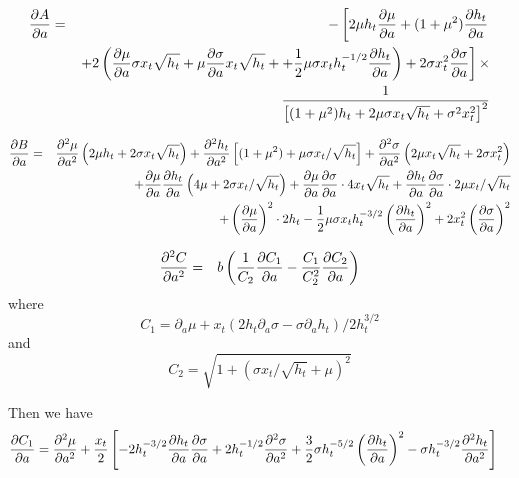 \documentclass{book}
\begin{document}
\begin{enumerate}
  \begin{eqnarray*}
    \frac{\partial A}{\partial a} &=& - \left[
      2\mu h_t \frac{\partial \mu}{\partial a} + (1 + \mu^2) \frac{\partial h_t}{\partial a} \right.\\
    && \left.
      + 2\left(
        \frac{\partial \mu}{\partial a} \sigma x_t \sqrt{h_t} +
        \mu \frac{\partial \sigma}{\partial a} x_t \sqrt{h_t} +
        +{1 \over 2} \mu\sigma x_t h_t^{-1/2} \frac{\partial h_t}{\partial a}
      \right) +2 \sigma x_t^2 \frac{\partial \sigma}{\partial a} \right] \times \\
    && {1 \over
      \left[
        (1 + \mu^2)h_t  +2\mu\sigma x_t \sqrt{h_t} + \sigma^2 x_t^2
      \right]^2}
  \end{eqnarray*}

  \begin{eqnarray*}
    \frac{\partial B}{\partial a} &=&
    \frac{\partial^2 \mu}{\partial a^2} \left(
      2 \mu h_t + 2 \sigma x_t \sqrt{h_t}
    \right) +\frac{\partial^2 h_t}{\partial a^2} \left[
      (1 + \mu^2) + \mu \sigma x_t / \sqrt{h_t}
    \right] +\frac{\partial^2 \sigma}{\partial a^2} \left(
      2 \mu x_t \sqrt{h_t} + 2 \sigma x_t^2
    \right) \\
    &&
    +\frac{\partial \mu}{\partial a} \frac{\partial h_t}{\partial a} \left(
      4 \mu + 2 \sigma x_t / \sqrt{h_t}
    \right) +\frac{\partial \mu}{\partial a} \frac{\partial \sigma}{\partial a} \cdot 4 x_t \sqrt{h_t}
    +\frac{\partial h_t}{\partial a} \frac{\partial \sigma}{\partial a} \cdot 2 \mu x_t / \sqrt{h_t} \\
    && +\left(\frac{\partial \mu}{\partial a} \right)^2 \cdot 2 h_t
    - {1 \over 2} \mu \sigma x_t h_t^{-3/2} \left( \frac{\partial h_t}{\partial a} \right)^2
    + 2 x_t^2 \left( \frac{\partial \sigma}{\partial a} \right)^2
  \end{eqnarray*}

  \begin{eqnarray*}
    \frac{\partial^2 C}{\partial a^2} &=& b \left(
      {1 \over C_2}\frac{\partial C_1}{\partial a} - {C_1 \over C_2^2} \frac{\partial C_2}{\partial a}
    \right)
  \end{eqnarray*}
  where
  \begin{equation*}
    C_1 = \partial_a \mu + x_t
    (2h_t\partial_a\sigma - \sigma\partial_ah_t) / 2h_t^{3/2}
  \end{equation*}
  and
  \begin{equation*}
    C_2 = \sqrt{1 + (\sigma x_t / \sqrt{h_t} + \mu)^2}
  \end{equation*}

  Then we have
  \begin{align*}
    \frac{\partial C_1}{\partial a} &= \frac{\partial^2 \mu}{\partial a^2} + {x_t \over 2}\left[
      -2 h_t^{-3/2} \frac{\partial h_t}{\partial a}\frac{\partial \sigma}{\partial a} + 2h_t^{-1/2}
      \frac{\partial^2 \sigma}{\partial a^2} + {3 \over 2} \sigma h_t^{-5/2} \left(
        \frac{\partial h_t}{\partial a} \right)^2 - \sigma h_t^{-3/2} \frac{\partial^2 h_t}{\partial a^2}
    \right]
  \end{align*}


\end{enumerate}
\end{document}
